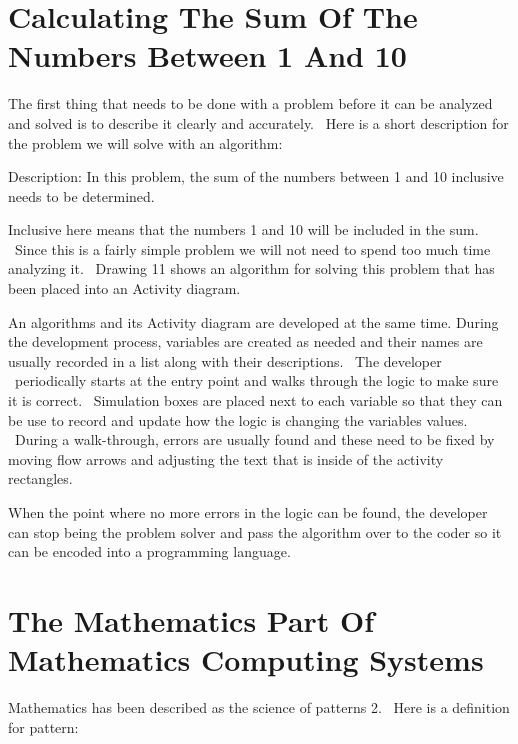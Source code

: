 \documentclass[12pt,twoside]{book}
\begin{document}
\section[Calculating The Sum Of The Numbers Between 1 And 10]{
Calculating The Sum Of The Numbers Between 1 And 10}

The first thing that needs to be done with a problem before it can be
analyzed and solved is to describe it clearly and accurately. \ Here is
a short description for the problem we will solve with an algorithm:


\bigskip

Description: In this problem, the sum of the numbers between 1 and 10
inclusive needs to be determined.


\bigskip

Inclusive here means that the numbers 1 and 10 will be included in the
sum. \ Since this is a fairly simple problem we will not need to spend
too much time analyzing it. \ Drawing 11 shows an algorithm for solving
this problem that has been placed into an Activity diagram.


\bigskip


\bigskip

An algorithms and its Activity diagram are developed at the same time.
During the development process, variables are created as needed and
their names are usually recorded in a list along with their
descriptions. \ The developer \ periodically starts at the entry point
and walks through the logic to make sure it is correct. \ Simulation
boxes are placed next to each variable so that they can be use to
record and update how the logic is changing the
variable{\textquotesingle}s values. \ During a walk{}-through, errors
are usually found and these need to be fixed by moving flow arrows and
adjusting the text that is inside of the activity rectangles.


\bigskip

When the point where no more errors in the logic can be found, the
developer can stop being the problem solver and pass the algorithm over
to the coder so it can be encoded into a programming language.

\section[The Mathematics Part Of Mathematics Computing
Systems]{The Mathematics Part Of Mathematics Computing Systems}
Mathematics has been described as the {\textquotedbl}science of
patterns{\textquotedbl} 2. \ Here is a definition for pattern:
\end{document}
